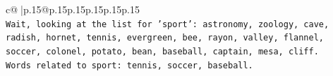 \documentclass{article}
\begin{document}
{\begin{supertabular}{c@{$\;$}|p{.15\linewidth}@{}p{.15\linewidth}p{.15\linewidth}p{.15\linewidth}p{.15\linewidth}p{.15\linewidth}}
{{{\\ 
\texttt{Wait, looking at the list for 'sport': astronomy, zoology, cave, radish, hornet, tennis, evergreen, bee, rayon, valley, flannel, soccer, colonel, potato, bean, baseball, captain, mesa, cliff.} \\
\texttt{Words related to sport: tennis, soccer, baseball.} \\
            }
        }
    }
     \\ \\

\end{supertabular}
}
\end{document}
